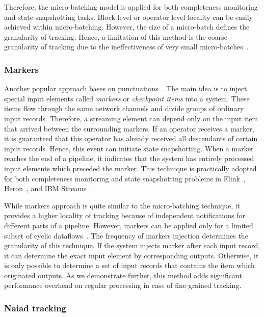 Therefore, the micro-batching model is applied for both completeness monitoring and state snapshotting tasks. Block-level or operator level locality can be easily achieved within micro-batching. However, the size of a micro-batch defines the granularity of tracking. Hence, a limitation of this method is the coarse granularity of tracking due to the ineffectiveness of very small micro-batches~\cite{Zaharia:2012:DSE:2342763.2342773}.

\subsubsection{Markers}

Another popular approach bases on punctuations~\cite{Tucker:2003:EPS:776752.776780}. The main idea is to inject special input elements called {\em markers} or {\em checkpoint items} into a system. These items flow through the same network channels and divide groups of ordinary input records. Therefore, a streaming element can depend only on the input item that arrived between the surrounding markers. If an operator receives a marker, it is guaranteed that this operator has already received all descendants of certain input records. Hence, this event can initiate state snapshotting. When a marker reaches the end of a pipeline, it indicates that the system has entirely processed input elements which preceded the marker. This technique is practically adopted for both completeness monitoring and state snapshotting problems in Flink~\cite{Carbone:2017:SMA:3137765.3137777}, Heron~\cite{Kulkarni:2015:THS:2723372.2742788}, and IBM Streams~\cite{jacques2016consistent}. 

While markers approach is quite similar to the micro-batching technique, it provides a higher locality of tracking because of independent notifications for different parts of a pipeline. However, markers can be applied only for a limited subset of cyclic dataflows~\cite{carbone2018scalable}. The frequency of markers injection determines the granularity of this technique. If the system injects marker after each input record, it can determine the exact input element by corresponding outputs. Otherwise, it is only possible to determine a set of input records that contains the item which originated outputs. As we demonstrate further, this method adds significant performance overhead on regular processing in case of fine-grained tracking.

\subsubsection{Naiad tracking}

